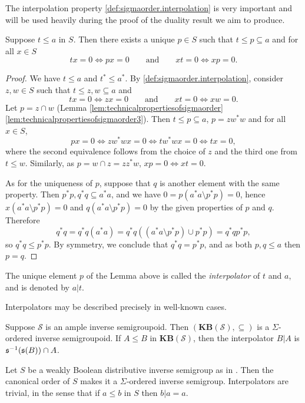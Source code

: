 The interpolation property \ref{def:sigmaorder.interpolation} is very important and will be used heavily during the proof of the duality result we aim to produce.

\begin{lemma}
    Suppose $t\leq a$ in $S$. Then there exists a unique $p\in S$ such that $t\leq p\subseteq a$ and for all $x\in S$
    \[tx=0\iff px=0\qquad\text{and}\qquad xt=0\iff xp=0.\]
\end{lemma}
\begin{proof}
    We have $t\leq a$ and $t^*\leq a^*$. By \ref{def:sigmaorder.interpolation}, consider $z,w\in S$ such that $t\leq z,w\subseteq a$ and
    \[tx=0\iff zx=0\qquad\text{and}\qquad xt=0\iff xw=0.\]
    Let $p=z\cap w$ (Lemma \ref{lem:technicalpropertiesofsigmaorder}\ref{lem:technicalpropertiesofsigmaorder3}). Then $t\leq p\subseteq a$, $p=zw^*w$ and for all $x\in S$,
    \[px=0\iff zw^*wx=0\iff tw^*wx=0\iff tx=0,\]
    where the second equivalence follows from the choice of $z$ and the third one from $t\leq w$. Similarly, as $p=w\cap z=zz^*w$, $xp=0\iff xt=0$.
    
    As for the uniqueness of $p$, suppose that $q$ is another element with the same property. Then $p^*p,q^*q\subseteq a^*a$, and we have $0=p(a^*a\setminus p^*p)=0$, hence $x(a^*a\setminus p^*p)=0$ and $q(a^*a\setminus p^*p)=0$ by the given properties of $p$ and $q$. Therefore
    \[q^*q=q^*q(a^*a)=q^*q((a^*a\setminus p^*p)\cup p^*p)=q^*qp^*p,\]
    so $q^*q\leq p^*p$. By symmetry, we conclude that $q^*q=p^*p$, and as both $p,q\leq a$ then $p=q$.
    \qedhere
\end{proof}

\begin{definition}
    The unique element $p$ of the Lemma above is called the \emph{interpolator} of $t$ and $a$, and is denoted by $a|t$.
\end{definition}

Interpolators may be described precisely in well-known cases.

\begin{example}
    Suppose $\mathcal{S}$ is an ample inverse semigroupoid. Then $(\mathbf{KB}(\mathcal{S}),\subseteq)$ is a $\Sigma$-ordered inverse semigroupoid. If $A\leq B$ in $\mathbf{KB}(\mathcal{S})$, then the interpolator $B|A$ is $\operatorname{\mathfrak{s}}^{-1}(\operatorname{\mathfrak{s}}(B))\cap A$.
\end{example}

\begin{example}\label{ex:weaklybooleanaresigma}
    Let $S$ be a weakly Boolean distributive inverse semigroup as in \cite{MR3077869}. Then the canonical order of $S$ makes it a $\Sigma$-ordered inverse semigroup. Interpolators are trivial, in the sense that if $a\leq b$ in $S$ then $b|a=a$.
\end{example}

